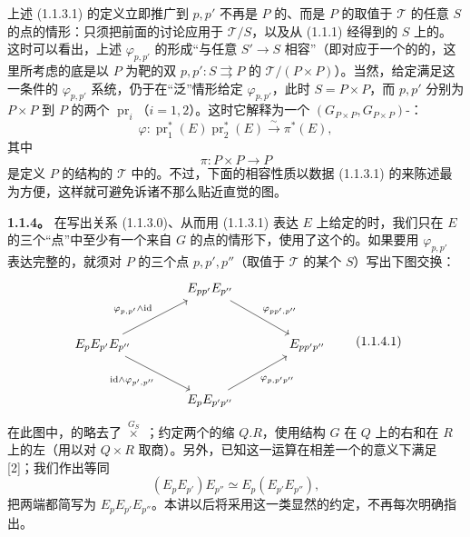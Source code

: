 上述 (1.1.3.1) 的定义立即推广到 $p,p'$ 不再是 $P$ 的、而是 $P$ 的取值于 $\mathcal T$ 的任意 $S$ 的点的情形：只须把前面的讨论应用于 $\mathcal T/S$，以及从 (1.1.1) 经得到的 $S$ 上的。这时可以看出，上述 $\varphi_{p,p'}$ 的形成“与任意 $S'\to S$ 相容”（即对应于一个的的，这里所考虑的底是以 $P$ 为靶的双 $p,p':S\rightrightarrows P$ 的 $\mathcal T/(P\times P)$）。当然，给定满足这一条件的 $\varphi_{p,p'}$ 系统，仍于在“泛”情形给定 $\varphi_{p,p'}$，此时 $S=P\times P$，而 $p,p'$ 分别为 $P\times P$ 到 $P$ 的两个 $\operatorname{pr}_i$（$i=1,2$）。这时它解释为一个 $(G_{P\times P},G_{P\times P})$-：
\[
\varphi:\operatorname{pr}_1^*(E)\operatorname{pr}_2^*(E)\xrightarrow{\sim}\pi^*(E),
\tag{1.1.3.2}
\]
其中
\[
\pi:P\times P\longrightarrow P
\]
是定义 $P$ 的结构的 $\mathcal T$ 中的。不过，下面的相容性质以数据 (1.1.3.1) 的来陈述最为方便，这样就可避免诉诸不那么贴近直觉的图。

\textbf{1.1.4。} 在写出关系 (1.1.3.0)、从而用 (1.1.3.1) 表达 $E$ 上给定的时，我们只在 $E$ 的三个“点”中至少有一个来自 $G$ 的点的情形下，使用了这个的。如果要用 $\varphi_{p,p'}$ 表达完整的，就须对 $P$ 的三个点 $p,p',p''$（取值于 $\mathcal T$ 的某个 $S$）写出下图交换：
\[
\begin{tikzcd}[column sep=large,row sep=large]
& E_{pp'}E_{p''}\arrow[dr,"{\varphi_{pp',p''}}"] &\\
E_pE_{p'}E_{p''}\arrow[ur,"{\varphi_{p,p'}\wedge\mathrm{id}}"]\arrow[dr,"{\mathrm{id}\wedge\varphi_{p',p''}}"'] && E_{pp'p''}\\
& E_pE_{p'p''}\arrow[ur,"{\varphi_{p,p'p''}}"'] &
\end{tikzcd}
\tag{1.1.4.1}
\]
在此图中，的略去了 $\mathbin{\overset{G_S}{\times}}$ ；约定两个的缩 $Q.R$，使用结构 $G$ 在 $Q$ 上的右和在 $R$ 上的左（用以对 $Q\times R$ 取商）。另外，已知这一运算在相差一个的意义下满足 [2]；我们作出等同
\[
(E_pE_{p'})E_{p''}\simeq E_p(E_{p'}E_{p''}),
\]
把两端都简写为 $E_pE_{p'}E_{p''}$。本讲以后将采用这一类显然的约定，不再每次明确指出。


